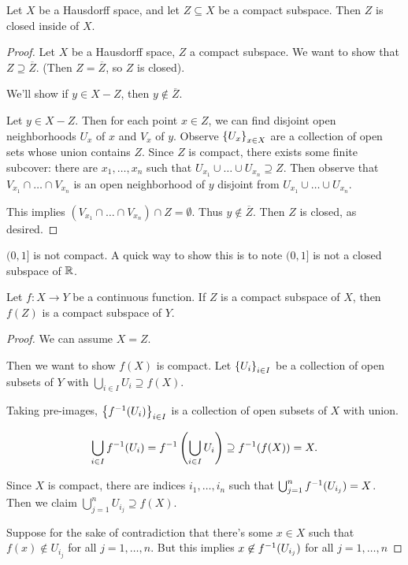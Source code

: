 \documentclass[12pt, twosided]{article}
\begin{document}
\begin{thm}
  Let \(X\) be a Hausdorff space, and let \(Z \subseteq X\) be a compact subspace. Then \(Z\) is closed inside of \(X\). 
\end{thm}
\begin{proof}
  Let \(X\) be a Hausdorff space, \(Z\) a compact subspace. We want to show that \(Z \supseteq \overline{Z}\). (Then \(Z = \overline{Z}\), so \(Z\) is closed).

  We'll show if \(y \in X - Z\), then \(y \not\in \overline{Z}\).

  Let \(y \in X - Z\). Then for each point \(x \in Z\), we can find disjoint open neighborhoods \(U_x\) of \(x\) and \(V_x\) of \(y\). Observe \(\left\{ U_x \right\}_{x \in X}\) are a collection of open sets whose union contains \(Z\). Since \(Z\) is compact, there exists some finite subcover: there are \(x_1, \ldots, x_n\) such that \(U_{x_1} \cup \ldots \cup U_{x_n} \supseteq Z\). Then observe that \(V_{x_1} \cap \ldots \cap V_{x_n}\) is an open neighborhood of \(y\) disjoint from \(U_{x_1} \cup \ldots \cup U_{x_n}\).

  This implies \(\left( V_{x_1} \cap \ldots \cap V_{x_n}\right) \cap Z = \emptyset\). Thus \(y \not\in \overline{Z}\). Then \(Z\) is closed, as desired.
\end{proof}

\begin{exa}
  \((0,1]\) is not compact. A quick way to show this is to note \((0,1]\) is not a closed subspace of \(\mathbb{R}\).
\end{exa}

\begin{thm}
  Let \(f: X \to Y\) be a continuous function. If \(Z\) is a compact subspace of \(X\), then \(f(Z)\) is a compact subspace of \(Y\).
\end{thm}
\begin{proof}
  We can assume \(X = Z\).

  Then we want to show \(f(X)\) is compact. Let \(\left\{ U_i \right\}_{i \in I}\) be a collection of open subsets of \(Y\) with \(\bigcup_{i \in I} U_i \supseteq f(X)\).

  Taking pre-images, \(\left\{ f^{-1}(U_i) \right\}_{i \in I}\) is a collection of open subsets of \(X\) with union.

  \begin{align*}
    \bigcup_{i \in I} f^{-1}(U_i) = f^{-1}\left(\bigcup_{i \in I} U_i\right) \supseteq f^{-1}(f(X)) = X.
  \end{align*}

  Since \(X\) is compact, there are indices \(i_1, \ldots, i_n\) such that \(\bigcup_{j = 1}^n f^{-1}(U_{i_j}) = X\). Then we claim \(\bigcup_{j = 1}^n U_{i_j} \supseteq f(X)\).

  Suppose for the sake of contradiction that there's some \(x \in X\) such that \(f(x) \not\in U_{i_j}\) for all \(j = 1, \ldots, n\). But this implies \(x \not\in f^{-1}(U_{i_j})\) for all \(j = 1, \ldots, n\) \nope
\end{proof}
\end{document}
